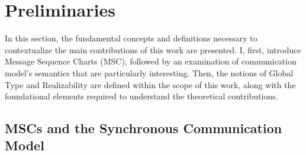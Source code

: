 \chapter{Preliminaries}\label{sec:pre}
In this section, the fundamental concepts and definitions necessary 
to contextualize the main contributions of this work are presented. 
I, first, introduce Message Sequence Charts (MSC), followed by 
an examination of communication model's semantics that are particularly interesting. 
Then, the notions of Global Type and Realizability are 
defined within the scope of this work, along with the foundational 
elements required to understand the theoretical contributions.

\section{MSCs and the Synchronous Communication Model}

